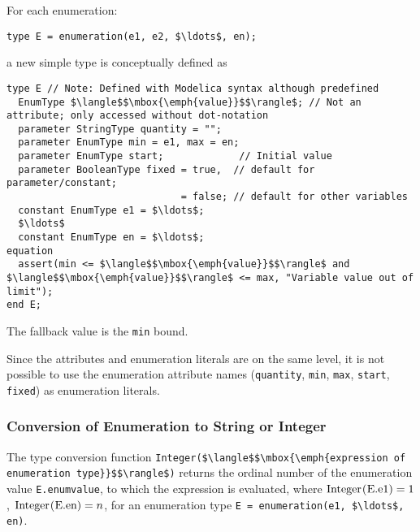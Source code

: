 For each enumeration:
\begin{lstlisting}[language=modelica]
type E = enumeration(e1, e2, $\ldots$, en);
\end{lstlisting}
a new simple type is conceptually defined as
\begin{lstlisting}[language=modelica]
type E // Note: Defined with Modelica syntax although predefined
  EnumType $\langle$$\mbox{\emph{value}}$$\rangle$; // Not an attribute; only accessed without dot-notation
  parameter StringType quantity = "";
  parameter EnumType min = e1, max = en;
  parameter EnumType start;             // Initial value
  parameter BooleanType fixed = true,  // default for parameter/constant;
                              = false; // default for other variables
  constant EnumType e1 = $\ldots$;
  $\ldots$
  constant EnumType en = $\ldots$;
equation
  assert(min <= $\langle$$\mbox{\emph{value}}$$\rangle$ and $\langle$$\mbox{\emph{value}}$$\rangle$ <= max, "Variable value out of limit");
end E;
\end{lstlisting}

The fallback value is the \lstinline!min! bound.

\begin{nonnormative}
Since the attributes and enumeration literals are on the same
level, it is not possible to use the enumeration attribute names
(\lstinline!quantity!, \lstinline!min!, \lstinline!max!, \lstinline!start!, \lstinline!fixed!) as enumeration literals.
\end{nonnormative}

\subsubsection{Conversion of Enumeration to String or Integer}\label{conversion-of-enumeration-to-string-or-integer}\label{type-conversion-of-enumeration-values-to-string-or-integer}

The type conversion function \lstinline!Integer($\langle$$\mbox{\emph{expression of enumeration type}}$$\rangle$)! returns the ordinal number of the enumeration value \lstinline!E.enumvalue!, to which the expression is evaluated, where $\text{\lstinline!Integer(E.e1)!} = 1$, $\text{\lstinline!Integer(E.en)!} = n$, for an enumeration type \lstinline!E = enumeration(e1, $\ldots$, en)!.

